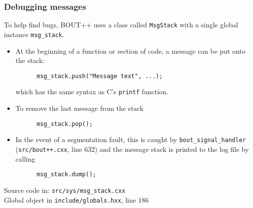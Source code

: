 \documentclass{beamer}
\begin{document}
\begin{frame}[fragile]
  \frametitle{Debugging messages}
  
  To help find bugs, BOUT++ uses a class called \texttt{MsgStack}
  with a single global instance \texttt{msg\_stack}. 
  
  \begin{itemize}
  \item At the beginning of a function or section of code, a message
    can be put onto the stack:
    \begin{verbatim}
      msg_stack.push("Message text", ...);
    \end{verbatim}
    \vspace{-0.5cm}
    which has the same syntax as C's \texttt{printf} function.
  \item To remove the last message from the stack
    \begin{verbatim}
      msg_stack.pop();
    \end{verbatim}
    \vspace{-0.5cm}
  \item In the event of a segmentation fault, this is caught by
    \texttt{bout\_signal\_handler} (\texttt{src/bout++.cxx}, line 632)
    and the message stack is printed to the log file by calling
    \begin{verbatim}
      msg_stack.dump();
    \end{verbatim}
    \vspace{-0.5cm}
  \end{itemize}

  \begin{block}
    
    \begin{center}
      Source code in: \texttt{src/sys/msg\_stack.cxx} \\
      Global object in \texttt{include/globals.hxx}, line 186
    \end{center}
  \end{block}
\end{frame}
\end{document}
